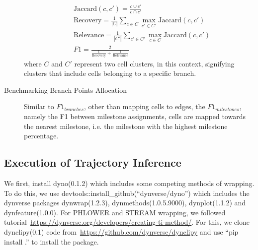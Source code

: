 \begin{description}
	\begin{equation}
	\label{eqn:corrdist}
	\begin{aligned}
	& \text{Jaccard}(c, c')  = \frac{c\cup c'}{c\cap c'} \\
	& \text{Recovery} = \frac{1}{|C|}\sum_{c\in C} \max_{c'\in C'} \text{Jaccard}(c, c') \\
	& \text{Relevance} = \frac{1}{|C'|}\sum_{c' \in C'} \max_{c\in C} \text{Jaccard}(c, c')\\
	& F1 = \frac{2}{\frac{1}{\text{Recovery}} + \frac{1}{\text{Relevance}}}
	\end{aligned}
	\end{equation}
	where $C$ and $C'$ represent two cell clusters, in this context, signifying clusters that include cells belonging to a specific branch.
	\item[Benchmarking Branch Points Allocation]
	Similar to $F1_{branches}$, other than mapping cells to edges, the $F1_{milestones}$, namely the F1 between milestone assignments, cells are mapped towards the nearest milestone, i.e. the milestone with the highest milestone percentage.
\end{description}


\subsection{Execution of Trajectory Inference}
\label{PHLOWER_bench:exe}
We first, install dyno(0.1.2) which includes some competing methods of wrapping. To do this, we use devtools::install\_github(``dynverse/dyno'') which includes the dynverse packages dynwrap(1.2.3),  dynmethods(1.0.5.9000), dynplot(1.1.2) and dynfeature(1.0.0). For PHLOWER and STREAM wrapping, we followed tutorial~\url{https://dynverse.org/developers/creating-ti-method/}. For this, we clone dynclipy(0.1) code from~\url{https://github.com/dynverse/dynclipy} and use ``pip install .'' to install the package.

